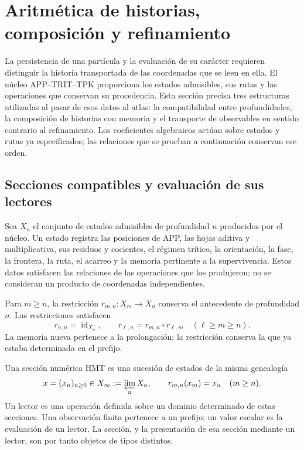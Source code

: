 \section{Aritmética de historias, composición y refinamiento}
\label{vi:hist:seccion-principal}

La persistencia de una partícula y la evaluación de su carácter requieren
distinguir la historia transportada de las coordenadas que se leen en ella.
El núcleo APP--TRIT--TPK proporciona los estados admisibles, sus rutas y
las operaciones que conservan su procedencia. Esta sección precisa tres
estructuras utilizadas al pasar de esos datos al atlas: la compatibilidad
entre profundidades, la composición de historias con memoria y el
transporte de observables en sentido contrario al refinamiento.
Los coeficientes algebraicos actúan sobre estados y rutas ya especificados;
las relaciones que se prueban a continuación conservan ese orden.

\subsection{Secciones compatibles y evaluación de sus lectores}
\label{hist:seccion}

Sea \(X_n\) el conjunto de estados admisibles de profundidad \(n\)
producidos por el núcleo. Un estado registra las posiciones de APP, las
hojas aditiva y multiplicativa, sus residuos y cocientes, el régimen
trítico, la orientación, la fase, la frontera, la ruta, el acarreo y la
memoria pertinente a la supervivencia. Estos datos satisfacen las
relaciones de las operaciones que los produjeron; no se consideran un
producto de coordenadas independientes.

Para \(m\ge n\), la restricción
\(r_{m,n}:X_m\longrightarrow X_n\) conserva el antecedente de profundidad
\(n\). Las restricciones satisfacen
\begin{equation}
 r_{n,n}=\operatorname{id}_{X_n},\qquad
 r_{\ell,n}=r_{m,n}\circ r_{\ell,m}
 \quad(\ell\ge m\ge n).
 \label{vi:hist:restricciones}
\end{equation}
La memoria nueva pertenece a la prolongación; la restricción conserva la
que ya estaba determinada en el prefijo.

\begin{definition}
Una sección numérica HMT es una sucesión de estados de la misma genealogía
\begin{equation}
 x=(x_n)_{n\ge0}\in X_\infty:=\varprojlim_n X_n,
 \qquad r_{m,n}(x_m)=x_n\quad(m\ge n).
 \label{vi:hist:limite-inverso}
\end{equation}
Un lector es una operación definida sobre un dominio determinado de estas
secciones. Una observación finita pertenece a un prefijo; un valor escalar
es la evaluación de un lector. La sección, y la presentación de esa sección
mediante un lector, son por tanto objetos de tipos distintos.
\end{definition}

